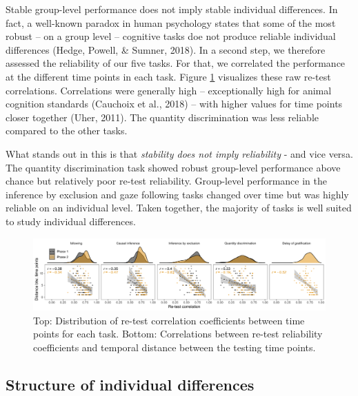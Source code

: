 \documentclass[
  man,floatsintext]{apa6}
\begin{document}
Stable group-level performance does not imply stable individual differences. In fact, a well-known paradox in human psychology states that some of the most robust -- on a group level -- cognitive tasks doe not produce reliable individual differences (Hedge, Powell, \& Sumner, 2018). In a second step, we therefore assessed the reliability of our five tasks. For that, we correlated the performance at the different time points in each task. Figure \ref{fig:relplot} visualizes these raw re-test correlations. Correlations were generally high -- exceptionally high for animal cognition standards (Cauchoix et al., 2018) -- with higher values for time points closer together (Uher, 2011). The quantity discrimination was less reliable compared to the other tasks.

What stands out in this is that \emph{stability does not imply reliability} - and vice versa. The quantity discrimination task showed robust group-level performance above chance but relatively poor re-test reliability. Group-level performance in the inference by exclusion and gaze following tasks changed over time but was highly reliable on an individual level. Taken together, the majority of tasks is well suited to study individual differences.

\begin{figure}
\includegraphics[width=1\linewidth]{./figures/reliability} \caption{Top: Distribution of re-test correlation coefficients between time points for each task. Bottom: Correlations between re-test reliability coefficients and temporal distance between the testing time points.}\label{fig:relplot}
\end{figure}

\hypertarget{structure-of-individual-differences}{%
\subsection{Structure of individual differences}\label{structure-of-individual-differences}}
\end{document}
